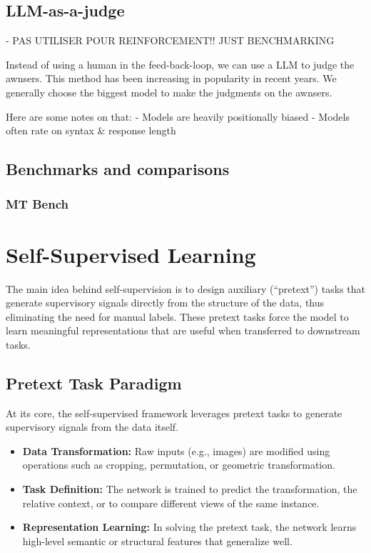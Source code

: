 \documentclass{article}
\begin{document}
\subsection{LLM-as-a-judge}

- PAS UTILISER POUR REINFORCEMENT!! JUST BENCHMARKING

Instead of using a human in the feed-back-loop, we can use a LLM to judge the awnsers. This method has been increasing in popularity in recent years. We generally choose the biggest model to make the judgments on the awnsers.

Here are some notes on that:
- Models are heavily positionally biased
- Models often rate on syntax & response length

\subsection{Benchmarks and comparisons}

\subsubsection{MT Bench}

\clearpage\newpage

\section{Self-Supervised Learning}

The main idea behind self-supervision is to design auxiliary (“pretext”) tasks that generate supervisory signals directly from the structure of the data, thus eliminating the need for manual labels. These pretext tasks force the model to learn meaningful representations that are useful when transferred to downstream tasks.

\subsection{Pretext Task Paradigm}

At its core, the self-supervised framework leverages pretext tasks to generate supervisory signals from the data itself.

\begin{itemize}
    \item \textbf{Data Transformation:} Raw inputs (e.g., images) are modified using operations such as cropping, permutation, or geometric transformation.
    \item \textbf{Task Definition:} The network is trained to predict the transformation, the relative context, or to compare different views of the same instance.
    \item \textbf{Representation Learning:} In solving the pretext task, the network learns high-level semantic or structural features that generalize well.
\end{itemize}
\end{document}
